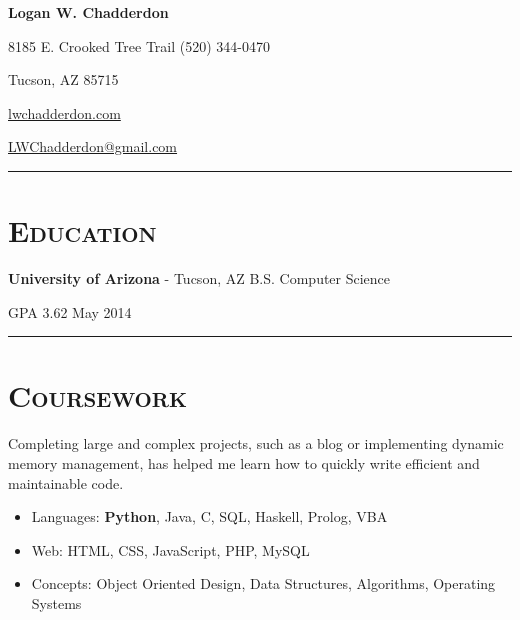 \documentclass[11pt,letterpaper]{article}
\newcommand{\Hsep}{\vspace{4mm} \hrule \vspace{-1mm}}
\begin{document}
\begin{minipage}{\textwidth}

\begin{center}
\LARGE \bfseries Logan W. Chadderdon
\end{center}

8185 E. Crooked Tree Trail \hfill (520) 344-0470

\vspace{-3mm}
\begin{multicols}{3}
Tucson, AZ 85715 

\begin{center}
\href{http://lwchadderdon.com}{lwchadderdon.com}
\end{center}

\hfill \href{mailto:LWChadderdon@gmail.com}{LWChadderdon@gmail.com}

\end{multicols}


\vspace{-1mm}
\hrule


\section{\scshape Education}
\vspace{-2mm}
{\bfseries University of Arizona} - Tucson, AZ \hfill B.S. Computer Science

GPA 3.62 \hfill May 2014

\Hsep

\section{\scshape Coursework}
\vspace{-3mm}
Completing large and complex projects, such as a blog or implementing dynamic memory management,
has helped me learn how to quickly write efficient and maintainable code.
\vspace{2mm}
\begin{itemize}
 \item Languages: {\bfseries Python}, Java, C, SQL, Haskell, Prolog, VBA
 \item Web: HTML, CSS, JavaScript, PHP, MySQL
 \item Concepts: Object Oriented Design, Data Structures, Algorithms, Operating Systems
\end{itemize}
\vspace{-3mm}

\end{minipage}
\end{document}
